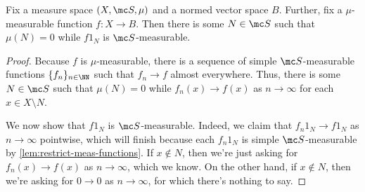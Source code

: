 \documentclass[../notes.tex]{subfiles}
\begin{document}
\begin{corollary} \label{cor:mu-meas-to-s-meas}
	Fix a measure space $(X,\mc S,\mu)$ and a normed vector space $B$. Further, fix a $\mu$-measurable function $f\colon X\to B$. Then there is some $N\in\mc S$ such that $\mu(N)=0$ while $f1_N$ is $\mc S$-measurable.
\end{corollary}
\begin{proof}
	Because $f$ is $\mu$-measurable, there is a sequence of simple $\mc S$-measurable functions $\{f_n\}_{n\in\NN}$ such that $f_n\to f$ almost everywhere. Thus, there is some $N\in\mc S$ such that $\mu(N)=0$ while $f_n(x)\to f(x)$ as $n\to\infty$ for each $x\in X\setminus N$.

	We now show that $f1_N$ is $\mc S$-measurable. Indeed, we claim that $f_n1_N\to f1_N$ as $n\to\infty$ pointwise, which will finish because each $f_n1_N$ is simple $\mc S$-measurable by \autoref{lem:restrict-meas-functions}. If $x\notin N$, then we're just asking for $f_n(x)\to f(x)$ as $n\to\infty$, which we know. On the other hand, if $x\notin N$, then we're asking for $0\to0$ as $n\to\infty$, for which there's nothing to say.
\end{proof}
\end{document}

